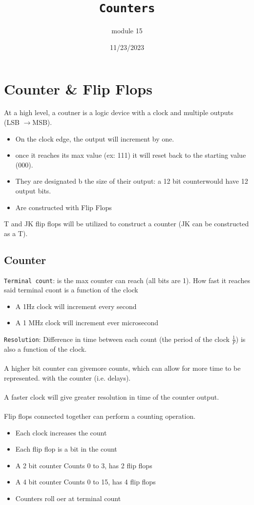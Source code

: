 \documentclass[a4paper,12pt]{article}
\title{\texttt{Counters}\\\hrulefill}
\author{module 15}
\date{\small{11/23/2023}}
\newcommand{\ra}{$\rightarrow$}
\begin{document}
    \maketitle

    \section{Counter \& Flip Flops}
        At a high level, a coutner is a logic device with a clock and multiple outputs (LSB \ra MSB).
        \begin{itemize}
            \item On the clock edge, the output will increment by one.
            \item once it reaches its max value (ex: 111) it will reset back to the starting value (000).
            \item They are designated b the size of their output: a 12 bit counterwould have 12 output bits.
            \item Are constructed with Flip Flops
        \end{itemize}
        T and JK flip flops will be utilized to construct a counter (JK can be constructed as a T). 

        \subsection{Counter}
            \texttt{Terminal count}: is the max counter can reach (all bits are 1). How fast it reaches said terminal cuont is a function of the clock
            \begin{itemize}
                \item A 1Hz clock will increment every second
                \item A 1 MHz clock will increment ever microsecond
            \end{itemize}
            \texttt{Resolution}: Difference in time between each count (the period of the clock $\frac{1}{F}$) is also a function of the clock.\\\\
            A higher bit counter can givemore counts, which can allow for more time to be represented. with the counter (i.e. delays).\\\\A faster clock will give greater resolution in time of the counter output.\\\\
            Flip flops connected together can perform a counting operation.
            \begin{itemize}
                \item Each clock increases the count
                \item Each flip flop is a bit in the count
                \item A 2 bit counter Counts 0 to 3, has 2 flip flops
                \item A 4 bit counter Counts 0 to 15, has 4 flip flops
                \item Counters roll oer at terminal count
            \end{itemize}
\end{document}
